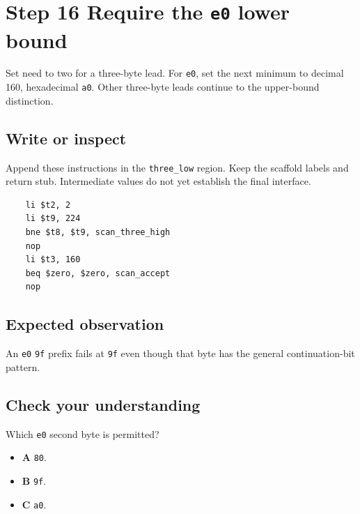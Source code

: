 \section{Step 16 Require the \texttt{e0} lower bound}\label{utf8-s16}

Set need to two for a three-byte lead. For \texttt{e0}, set the next minimum to decimal 160, hexadecimal \texttt{a0}. Other three-byte leads continue to the upper-bound distinction.

\subsection{Write or inspect}
Append these instructions in the \texttt{three\_low} region. Keep the scaffold labels and return stub. Intermediate values do not yet establish the final interface.

\begin{verbatim}
    li $t2, 2
    li $t9, 224
    bne $t8, $t9, scan_three_high
    nop
    li $t3, 160
    beq $zero, $zero, scan_accept
    nop
\end{verbatim}

\subsection{Expected observation}
An \texttt{e0} \texttt{9f} prefix fails at \texttt{9f} even though that byte has the general continuation-bit pattern.

\subsection{Check your understanding}
Which \texttt{e0} second byte is permitted?

\begin{itemize}
  \item \textbf{A} \texttt{80}.
  \item \textbf{B} \texttt{9f}.
  \item \textbf{C} \texttt{a0}.
\end{itemize}
